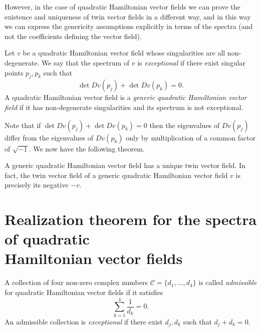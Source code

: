 \documentclass[phd,tocprelim]{cornell}
\begin{document}
However, in the case of quadratic Hamiltonian vector fields we can prove the existence and uniqueness of twin vector fields in a different way, and in this way we can express the genericity assumptions explicitly in terms of the spectra (and not the coefficients defining the vector field).

\begin{definition}
Let $v$ be a quadratic Hamiltonian vector field whose singularities are all non-degenerate. We say that the spectrum of $v$ is \emph{exceptional} if there exist singular points $p_j,p_k$ such that
\[ \det{Dv(p_j)}+\det{Dv(p_k)}=0. \]
A quadratic Hamiltonian vector field is a \emph{generic quadratic Hamiltonian vector field} if it has non-degenerate singularities and its spectrum is not exceptional.
\end{definition}

Note that if $\det{Dv(p_j)}+\det{Dv(p_k)}=0$ then the eigenvalues of $Dv(p_j)$ differ from the eigenvalues of $Dv(p_k)$ only by multiplication of a common factor of $\sqrt{-1}$. We now have the following theorem.

\begin{theorem}\label{thm:twinHam}
A generic quadratic Hamiltonian vector field has a unique twin vector field. In fact, the twin vector field of a generic quadratic Hamiltonian vector field $v$ is precisely its negative $-v$.
\end{theorem}





\section{\texorpdfstring{Realization theorem for the spectra of quadratic\\Hamiltonian vector fields}{Realization theorem for the spectra of quadratic Hamiltonian vector fields}}

\begin{definition}
A collection of four non-zero complex numbers $\mathcal{C}=\{d_1,\ldots,d_4\}$ is called \emph{admissible} for quadratic Hamiltonian vector fields if it satisfies
\[ \sum_{k=1}^4 \frac{1}{d_k} = 0. \]
An admissible collection is \emph{exceptional} if there exist $d_j,d_k$ such that $d_j+d_k=0$.
\end{definition}
\end{document}
